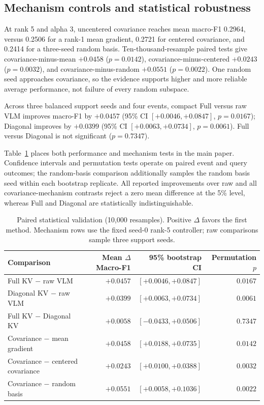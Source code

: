 \documentclass[conference]{IEEEtran}
\begin{document}
\subsection{Mechanism controls and statistical robustness}
At rank 5 and alpha 3, uncentered covariance reaches mean macro-F1 0.2964,
versus 0.2506 for a rank-1 mean gradient, 0.2721 for centered covariance, and
0.2414 for a three-seed random basis. Ten-thousand-resample paired tests give
covariance-minus-mean $+0.0458$ ($p=0.0142$), covariance-minus-centered
$+0.0243$ ($p=0.0032$), and covariance-minus-random $+0.0551$ ($p=0.0022$).
One random seed approaches covariance, so the evidence supports higher and
more reliable average performance, not failure of every random subspace.

Across three balanced support seeds and four events, compact Full versus raw
VLM improves macro-F1 by $+0.0457$ (95\% CI $[+0.0046,+0.0847]$,
$p=0.0167$); Diagonal improves by $+0.0399$ (95\% CI
$[+0.0063,+0.0734]$, $p=0.0061$). Full versus Diagonal is not significant
($p=0.7347$).

Table~\ref{tab:significance} places both performance and mechanism tests in the
main paper. Confidence intervals and permutation tests operate on paired event
and query outcomes; the random-basis comparison additionally samples the random
basis seed within each bootstrap replicate. All reported improvements over raw
and all covariance-mechanism contrasts reject a zero mean difference at the
5\% level, whereas Full and Diagonal are statistically indistinguishable.

\begin{table}[t]
\centering\small
\caption{Paired statistical validation (10,000 resamples). Positive $\Delta$
favors the first method. Mechanism rows use the fixed seed-0 rank-5 controller;
raw comparisons sample three support seeds.}
\label{tab:significance}
\begin{tabular}{lrrr}
\toprule
Comparison & Mean $\Delta$ Macro-F1 & 95\% bootstrap CI & Permutation $p$\\
\midrule
Full KV $-$ raw VLM & $+0.0457$ & $[+0.0046,+0.0847]$ & $0.0167$\\
Diagonal KV $-$ raw VLM & $+0.0399$ & $[+0.0063,+0.0734]$ & $0.0061$\\
Full KV $-$ Diagonal KV & $+0.0058$ & $[-0.0433,+0.0506]$ & $0.7347$\\
Covariance $-$ mean gradient & $+0.0458$ & $[+0.0188,+0.0735]$ & $0.0142$\\
Covariance $-$ centered covariance & $+0.0243$ & $[+0.0100,+0.0388]$ & $0.0032$\\
Covariance $-$ random basis & $+0.0551$ & $[+0.0058,+0.1036]$ & $0.0022$\\
\bottomrule
\end{tabular}
\end{table}
\end{document}
